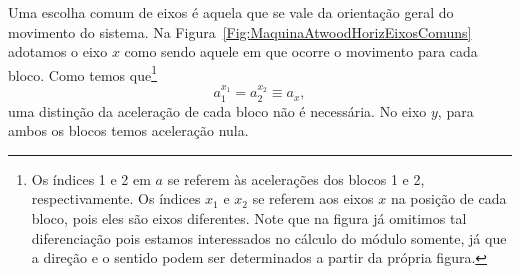 Uma escolha comum de eixos é aquela que se vale da orientação geral do movimento do sistema. Na Figura~\ref{Fig:MaquinaAtwoodHorizEixosComuns} adotamos o eixo $x$ como sendo aquele em que ocorre o movimento para cada bloco. Como temos que\footnote[][-2cm]{Os índices 1 e 2 em $a$ se referem às acelerações dos blocos 1 e 2, respectivamente. Os índices $x_1$ e $x_2$ se referem aos eixos $x$ na posição de cada bloco, pois eles são eixos diferentes. Note que na figura já omitimos tal diferenciação pois estamos interessados no cálculo do módulo somente, já que a direção e o sentido podem ser determinados a partir da própria figura.} 
\begin{equation}
    a_1^{x_1} = a_2^{x_2} \equiv a_x,
\end{equation}
%
uma distinção da aceleração de cada bloco não é necessária. No eixo $y$, para ambos os blocos temos aceleração nula.

